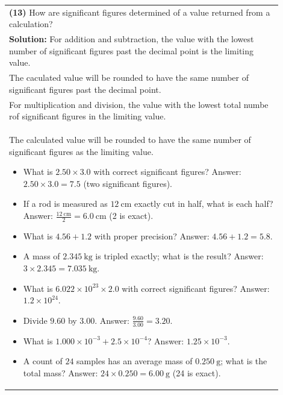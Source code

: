 \documentclass{article}
\begin{document}
\begin{tabular}{|p{0.9\linewidth}|}
\hline
\textbf{(13)} How are significant figures determined of a value returned from a calculation? \\
\textbf{Solution:} For addition and subtraction, the value with the lowest number of significant figures past the decimal point is the limiting value. \\
The caculated value will be rounded to have the same number of significant figures past the decimal point. \\
For multiplication and division, the value with the lowest total numbe rof significant figures in the limiting value. \\
The calculated value will be rounded to have the same number of significant figures as the limiting value.
\begin{itemize}
  \item What is $2.50 \times 3.0$ with correct significant figures? Answer: $2.50 \times 3.0 = 7.5$ (two significant figures).
  \item If a rod is measured as $12\ \mathrm{cm}$ exactly cut in half, what is each half? Answer: $\frac{12\ \mathrm{cm}}{2} = 6.0\ \mathrm{cm}$ (2 is exact).
  \item What is $4.56 + 1.2$ with proper precision? Answer: $4.56 + 1.2 = 5.8$.
  \item A mass of $2.345\ \mathrm{kg}$ is tripled exactly; what is the result? Answer: $3 \times 2.345 = 7.035\ \mathrm{kg}$.
  \item What is $6.022 \times 10^{23} \times 2.0$ with correct significant figures? Answer: $1.2 \times 10^{24}$.
  \item Divide $9.60$ by $3.00$. Answer: $\frac{9.60}{3.00} = 3.20$.
  \item What is $1.000 \times 10^{-3} + 2.5 \times 10^{-4}$? Answer: $1.25 \times 10^{-3}$.
  \item A count of $24$ samples has an average mass of $0.250\ \mathrm{g}$; what is the total mass? Answer: $24 \times 0.250 = 6.00\ \mathrm{g}$ (24 is exact).
\end{itemize}
\hline
\end{tabular}
\end{document}

